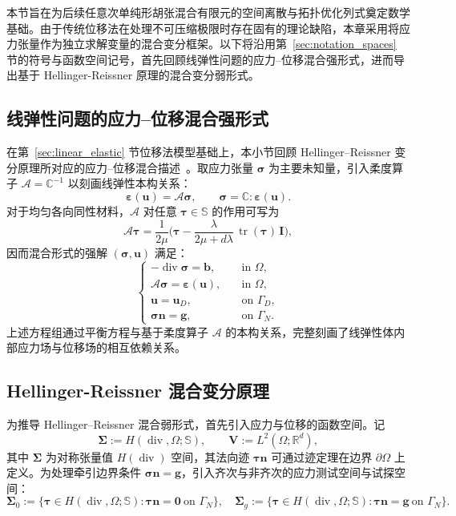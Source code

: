 本节旨在为后续任意次单纯形胡张混合有限元的空间离散与拓扑优化列式奠定数学基础。由于传统位移法在处理不可压缩极限时存在固有的理论缺陷，本章采用将应力张量作为独立求解变量的混合变分框架。以下将沿用第~\ref{sec:notation_spaces} 节的符号与函数空间记号，首先回顾线弹性问题的应力--位移混合强形式，进而导出基于 Hellinger-Reissner 原理的混合变分弱形式。


\subsection{线弹性问题的应力--位移混合强形式}
\label{subsec:hz_strong_form}

在第~\ref{sec:linear_elastic} 节位移法模型基础上，本小节回顾 Hellinger–Reissner 变分原理所对应的应力--位移混合描述~\cite{brezziMixedHybridFinite1991}。取应力张量 $\boldsymbol\sigma$ 为主要未知量，引入柔度算子 $\mathcal A=\mathbb C^{-1}$ 以刻画线弹性本构关系：
\[
\boldsymbol\varepsilon(\boldsymbol u)=\mathcal A\boldsymbol\sigma,\qquad  \boldsymbol\sigma=\mathbb C:\boldsymbol\varepsilon(\boldsymbol u).
\]
对于均匀各向同性材料，$\mathcal{A}$ 对任意 $\boldsymbol{\tau}\in\mathbb{S}$ 的作用可写为
\[
\mathcal{A}\boldsymbol{\tau} =\frac{1}{2\mu}\Big(\boldsymbol{\tau} -\frac{\lambda}{2\mu+d\lambda}\,\operatorname{tr}(\boldsymbol{\tau})\,\boldsymbol{I}\Big),
\]
因而混合形式的强解 $(\boldsymbol{\sigma},\boldsymbol{u})$ 满足：
\begin{equation} \label{eq:ch5_mixed_strong_form}
	\begin{cases}
		-\operatorname{div}\boldsymbol{\sigma} = \boldsymbol{b}, &\quad \text{in } \Omega, \\
		\mathcal{A}\boldsymbol{\sigma} = \boldsymbol{\varepsilon}(\boldsymbol{u}), &\quad \text{in } \Omega, \\
		\boldsymbol{u} = \boldsymbol{u}_{D}, &\quad \text{on } \Gamma_D, \\
		\boldsymbol{\sigma}\boldsymbol{n} = \boldsymbol{g}, &\quad \text{on } \Gamma_N.
	\end{cases}
\end{equation}
上述方程组通过平衡方程与基于柔度算子 $\mathcal{A}$ 的本构关系，完整刻画了线弹性体内部应力场与位移场的相互依赖关系。


\subsection{Hellinger-Reissner 混合变分原理}
\label{subsec:hz_hr_principle}

为推导 Hellinger–Reissner 混合弱形式，首先引入应力与位移的函数空间。记
\[
\boldsymbol{\Sigma} := {H}(\operatorname{div},\Omega;\mathbb{S}),\qquad\boldsymbol{V} := L^2(\Omega;\mathbb{R}^d),
\]
其中 $\boldsymbol{\Sigma}$ 为对称张量值 $H(\operatorname{div})$ 空间，其法向迹 $\boldsymbol{\tau}\boldsymbol{n}$ 可通过迹定理在边界 $\partial\Omega$ 上定义。为处理牵引边界条件 $\boldsymbol{\sigma}\boldsymbol{n}=\boldsymbol{g}$，引入齐次与非齐次的应力测试空间与试探空间：
\[
\boldsymbol{\Sigma}_0 :=\big\{\boldsymbol{\tau}\in{H}(\operatorname{div},\Omega;\mathbb{S}) : \boldsymbol{\tau}\boldsymbol{n}=\boldsymbol{0}\ \text{on }\Gamma_N\big\}, \quad \boldsymbol{\Sigma}_g :=\big\{\boldsymbol{\tau}\in{H}(\operatorname{div},\Omega;\mathbb{S}): \boldsymbol{\tau}\boldsymbol{n}=\boldsymbol{g}\ \text{on }\Gamma_N\big\}.
\]

